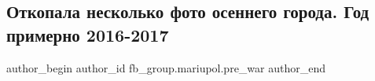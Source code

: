  
 
 
 
 

\subsection{Откопала несколько фото осеннего города. Год примерно 2016-2017}
\label{sec:16_02_2023.fb.fb_group.mariupol.pre_war.6.otkopala_neskolko_fo}

\ifcmt
 author_begin
   author_id fb_group.mariupol.pre_war
 author_end
\fi
